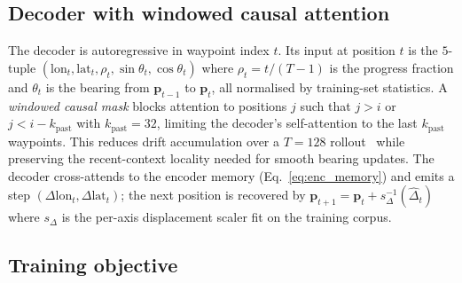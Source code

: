 \documentclass[11pt]{article}
\begin{document}
\subsection{Decoder with windowed causal attention}
\label{sec:method:decoder}

The decoder is autoregressive in waypoint index $t$. Its input at
position $t$ is the $5$-tuple
$(\text{lon}_t, \text{lat}_t, \rho_t, \sin\theta_t, \cos\theta_t)$
where $\rho_t = t / (T-1)$ is the progress fraction and $\theta_t$ is the
bearing from $\mathbf{p}_{t-1}$ to $\mathbf{p}_t$, all normalised by
training-set statistics. A \emph{windowed causal mask} blocks attention
to positions $j$ such that $j > i$ or $j < i - k_{\text{past}}$ with
$k_{\text{past}}=32$, limiting the decoder's self-attention to the last
$k_{\text{past}}$ waypoints. This reduces drift accumulation over a
$T=128$ rollout~\citep{transformer2017} while preserving the
recent-context locality needed for smooth bearing updates. The decoder
cross-attends to the encoder memory (Eq.~\ref{eq:enc_memory}) and emits
a step $(\Delta\text{lon}_t, \Delta\text{lat}_t)$; the next position is
recovered by $\mathbf{p}_{t+1} = \mathbf{p}_t + s_\Delta^{-1}(\hat{\Delta}_t)$
where $s_\Delta$ is the per-axis displacement scaler fit on the training
corpus.

\subsection{Training objective}
\label{sec:method:loss}
\end{document}
